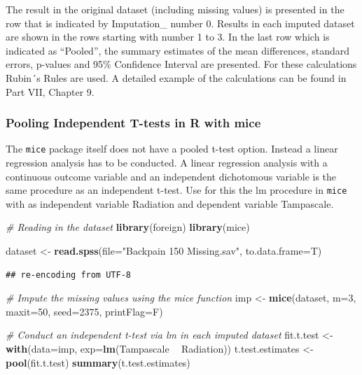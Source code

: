 \documentclass[
]{book}
\newenvironment{Shaded}{\begin{snugshade}}{\end{snugshade}}
\newcommand{\CommentTok}[1]{\textcolor[rgb]{0.56,0.35,0.01}{\textit{#1}}}
\newcommand{\DataTypeTok}[1]{\textcolor[rgb]{0.13,0.29,0.53}{#1}}
\newcommand{\DecValTok}[1]{\textcolor[rgb]{0.00,0.00,0.81}{#1}}
\newcommand{\KeywordTok}[1]{\textcolor[rgb]{0.13,0.29,0.53}{\textbf{#1}}}
\newcommand{\NormalTok}[1]{#1}
\newcommand{\OperatorTok}[1]{\textcolor[rgb]{0.81,0.36,0.00}{\textbf{#1}}}
\newcommand{\StringTok}[1]{\textcolor[rgb]{0.31,0.60,0.02}{#1}}
\begin{document}
The result in the original dataset (including missing values) is presented in the row that is indicated by Imputation\_ number 0. Results in each imputed dataset are shown in the rows starting with number 1 to 3. In the last row which is indicated as ``Pooled'', the summary estimates of the mean differences, standard errors, p-values and 95\% Confidence Interval are presented. For these calculations Rubin´s Rules are used. A detailed example of the calculations can be found in Part VII, Chapter 9.

\hypertarget{pooling-independent-t-tests-in-r-with-mice}{%
\subsubsection{Pooling Independent T-tests in R with mice}\label{pooling-independent-t-tests-in-r-with-mice}}

The \texttt{mice} package itself does not have a pooled t-test option. Instead a linear regression analysis has to be conducted. A linear regression analysis with a continuous outcome variable and an independent dichotomous variable is the same procedure as an independent t-test. Use for this the lm procedure in \texttt{mice} with as independent variable Radiation and dependent variable Tampascale.

\begin{Shaded}
\begin{Highlighting}[]
\CommentTok{# Reading in the dataset}
\KeywordTok{library}\NormalTok{(foreign)}
\KeywordTok{library}\NormalTok{(mice)}

\NormalTok{dataset <-}\StringTok{ }\KeywordTok{read.spss}\NormalTok{(}\DataTypeTok{file=}\StringTok{"Backpain 150 Missing.sav"}\NormalTok{, }\DataTypeTok{to.data.frame=}\NormalTok{T)}
\end{Highlighting}
\end{Shaded}

\begin{verbatim}
## re-encoding from UTF-8
\end{verbatim}

\begin{Shaded}
\begin{Highlighting}[]
\CommentTok{# Impute the missing values using the mice function }
\NormalTok{imp <-}\StringTok{ }\KeywordTok{mice}\NormalTok{(dataset, }\DataTypeTok{m=}\DecValTok{3}\NormalTok{, }\DataTypeTok{maxit=}\DecValTok{50}\NormalTok{, }\DataTypeTok{seed=}\DecValTok{2375}\NormalTok{, }\DataTypeTok{printFlag=}\NormalTok{F)}
 
\CommentTok{# Conduct an independent t-test via lm in each imputed dataset}
\NormalTok{fit.t.test <-}\StringTok{ }\KeywordTok{with}\NormalTok{(}\DataTypeTok{data=}\NormalTok{imp, }\DataTypeTok{exp=}\KeywordTok{lm}\NormalTok{(Tampascale }\OperatorTok{~}\StringTok{ }\NormalTok{Radiation))}
\NormalTok{t.test.estimates <-}\StringTok{ }\KeywordTok{pool}\NormalTok{(fit.t.test)}
\KeywordTok{summary}\NormalTok{(t.test.estimates)}
\end{Highlighting}
\end{Shaded}
\end{document}
